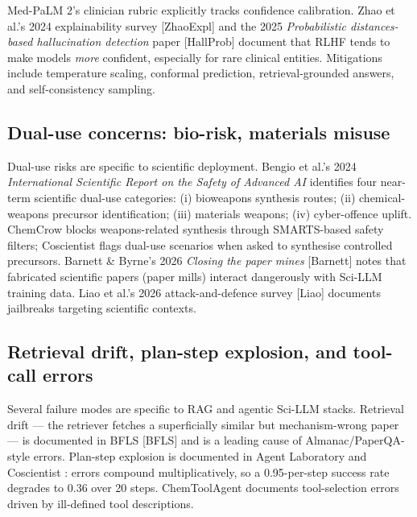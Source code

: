\documentclass{article}
\begin{document}
Med-PaLM 2's clinician rubric \cite{singhal2025towardexpertlevelm} explicitly tracks confidence calibration. Zhao et al.'s 2024 explainability survey {[}ZhaoExpl{]} and the 2025 \emph{Probabilistic distances-based hallucination detection} paper {[}HallProb{]} document that RLHF tends to make models \emph{more} confident, especially for rare clinical entities. Mitigations include temperature scaling, conformal prediction, retrieval-grounded answers, and self-consistency sampling.

\subsection{Dual-use concerns: bio-risk, materials misuse}\label{dual-use-concerns-bio-risk-materials-misuse}

Dual-use risks are specific to scientific deployment. Bengio et al.'s 2024 \emph{International Scientific Report on the Safety of Advanced AI} \cite{bengio2024internationalscien} identifies four near-term scientific dual-use categories: (i) bioweapons synthesis routes; (ii) chemical-weapons precursor identification; (iii) materials weapons; (iv) cyber-offence uplift. ChemCrow \cite{bran2024naturemachineintel} blocks weapons-related synthesis through SMARTS-based safety filters; Coscientist \cite{boiko2023nature6242023} flags dual-use scenarios when asked to synthesise controlled precursors. Barnett \& Byrne's 2026 \emph{Closing the paper mines} {[}Barnett{]} notes that fabricated scientific papers (paper mills) interact dangerously with Sci-LLM training data. Liao et al.'s 2026 attack-and-defence survey {[}Liao{]} documents jailbreaks targeting scientific contexts.

\subsection{Retrieval drift, plan-step explosion, and tool-call errors}\label{retrieval-drift-plan-step-explosion-and-tool-call-errors}

Several failure modes are specific to RAG and agentic Sci-LLM stacks. Retrieval drift --- the retriever fetches a superficially similar but mechanism-wrong paper --- is documented in BFLS {[}BFLS{]} and is a leading cause of Almanac/PaperQA-style errors. Plan-step explosion is documented in Agent Laboratory \cite{schmidgall2025agentlaboratoryusi} and Coscientist \cite{boiko2023nature6242023}: errors compound multiplicatively, so a 0.95-per-step success rate degrades to 0.36 over 20 steps. ChemToolAgent \cite{yu2024chemtoolagenttheim} documents tool-selection errors driven by ill-defined tool descriptions.
\end{document}
